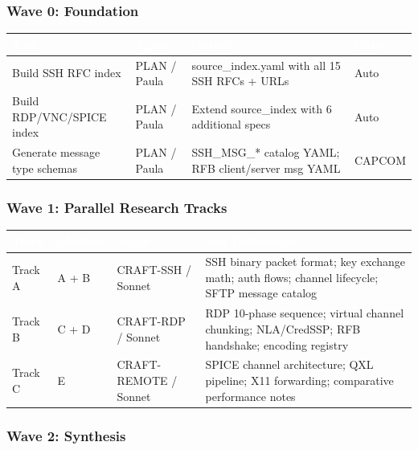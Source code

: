 \documentclass[11pt,letterpaper]{article}
\newcommand{\tableheader}[1]{\textbf{\sffamily\textcolor{white}{#1}}}
\begin{document}
\subsubsection{Wave 0: Foundation}

\begin{center}
\begin{tabularx}{\textwidth}{L{3cm}L{2.5cm}XC{2cm}}
\toprule
{}
\tableheader{Task} & \tableheader{Agent} & \tableheader{Output} & \tableheader{Gate} \\
\midrule
Build SSH RFC index & PLAN / Paula & source\_index.yaml with all 15 SSH RFCs + URLs & Auto \\
Build RDP/VNC/SPICE index & PLAN / Paula & Extend source\_index with 6 additional specs & Auto \\
Generate message type schemas & PLAN / Paula & SSH\_MSG\_* catalog YAML; RFB client/server msg YAML & CAPCOM \\
\bottomrule
\end{tabularx}
\end{center}

\subsubsection{Wave 1: Parallel Research Tracks}

\begin{center}
\begin{tabularx}{\textwidth}{L{2cm}L{2.5cm}L{3cm}X}
\toprule
{}
\tableheader{Track} & \tableheader{Modules} & \tableheader{Agent} & \tableheader{Key Deliverables} \\
\midrule
Track A & A + B & CRAFT-SSH / Sonnet & SSH binary packet format; key exchange math; auth flows; channel lifecycle; SFTP message catalog \\
Track B & C + D & CRAFT-RDP / Sonnet & RDP 10-phase sequence; virtual channel chunking; NLA/CredSSP; RFB handshake; encoding registry \\
Track C & E & CRAFT-REMOTE / Sonnet & SPICE channel architecture; QXL pipeline; X11 forwarding; comparative performance notes \\
\bottomrule
\end{tabularx}
\end{center}

\subsubsection{Wave 2: Synthesis}
\end{document}
